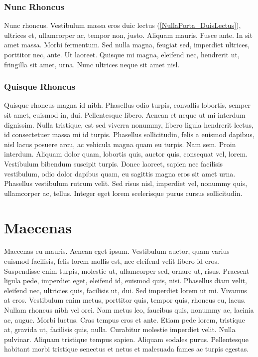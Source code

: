 \subsubsection{Nunc Rhoncus}
Nunc rhoncus. Vestibulum massa eros duic lectus (\ref{NullaPorta_DuisLectus}), ultrices et, ullamcorper ac, tempor non, justo. Aliquam mauris. Fusce ante. In sit amet massa. Morbi fermentum. Sed nulla magna, feugiat sed, imperdiet ultrices, porttitor nec, ante. Ut laoreet. Quisque mi magna, eleifend nec, hendrerit ut, fringilla sit amet, urna. Nunc ultrices neque sit amet nisl. 

\subsubsection{Quisque Rhoncus}
Quisque rhoncus magna id nibh. Phasellus odio turpis, convallis lobortis, semper sit amet, euismod in, dui. Pellentesque libero. Aenean et neque ut mi interdum dignissim. Nulla tristique, est sed viverra nonummy, libero ligula hendrerit lectus, id consectetuer massa mi id turpis. Phasellus sollicitudin, felis a euismod dapibus, nisl lacus posuere arcu, ac vehicula magna quam eu turpis. Nam sem. Proin interdum. Aliquam dolor quam, lobortis quis, auctor quis, consequat vel, lorem. Vestibulum bibendum suscipit turpis. Donec laoreet, sapien nec facilisis vestibulum, odio dolor dapibus quam, eu sagittis magna eros sit amet urna. Phasellus vestibulum rutrum velit. Sed risus nisl, imperdiet vel, nonummy quis, ullamcorper ac, tellus. Integer eget lorem scelerisque purus cursus sollicitudin.



\section{Maecenas}\label{NullaPorta_Maecenas}
Maecenas eu mauris. Aenean eget ipsum. Vestibulum auctor, quam varius euismod facilisis, felis lorem mollis est, nec eleifend velit libero id eros. Suspendisse enim turpis, molestie ut, ullamcorper sed, ornare ut, risus. Praesent ligula pede, imperdiet eget, eleifend id, euismod quis, nisi. Phasellus diam velit, eleifend nec, ultricies quis, facilisis ut, dui. Sed imperdiet lorem ut mi. Vivamus at eros. Vestibulum enim metus, porttitor quis, tempor quis, rhoncus eu, lacus. Nullam rhoncus nibh vel orci. Nam metus leo, faucibus quis, nonummy ac, lacinia ac, augue. Morbi luctus. Cras tempus eros et ante. Etiam pede lorem, tristique at, gravida ut, facilisis quis, nulla. Curabitur molestie imperdiet velit. Nulla pulvinar. Aliquam tristique tempus sapien. Aliquam sodales purus. Pellentesque habitant morbi tristique senectus et netus et malesuada fames ac turpis egestas. 


